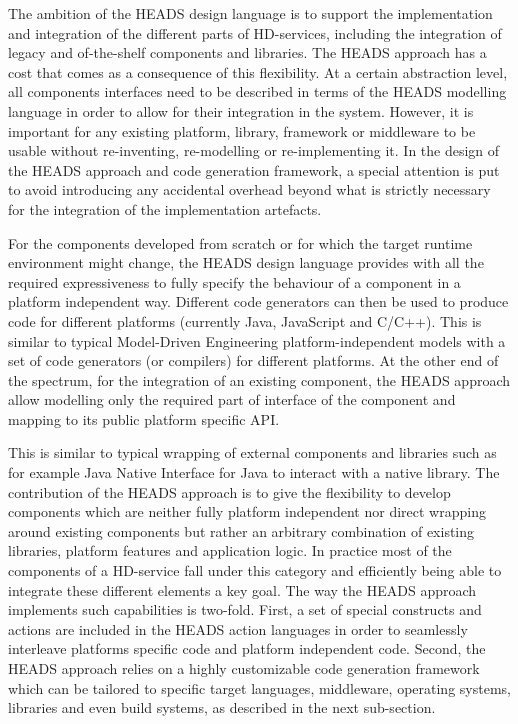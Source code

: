 The ambition of the HEADS design language is to support the implementation and integration of the different parts of HD-services, including the integration of legacy and of-the-shelf components and libraries. The HEADS approach has a cost that comes as a consequence of this flexibility. At a certain abstraction level, all components interfaces need to be described in terms of the HEADS modelling language in order to allow for their integration in the system. However, it is important for any existing platform, library, framework or middleware to be usable without re-inventing, re-modelling or re-implementing it. In the design of the HEADS approach and code generation framework, a special attention is put to avoid introducing any accidental overhead beyond what is strictly necessary for the integration of the implementation artefacts. 

For the components developed from scratch or for which the target runtime environment might change, the HEADS design language provides with all the required expressiveness to fully specify the behaviour of a component in a platform independent way. Different code generators can then be used to produce code for different platforms (currently Java, JavaScript and C/C++). This is similar to typical Model-Driven Engineering platform-independent models with a set of code generators (or compilers) for different platforms. At the other end of the spectrum, for the integration of an existing component, the HEADS approach allow modelling only the required part of interface of the component and mapping to its public platform specific API. 

This is similar to typical wrapping of external components and libraries such as for example Java Native Interface for Java to interact with a native library. The contribution of the HEADS approach is to give the flexibility to develop components which are neither fully platform independent nor direct wrapping around existing components but rather an arbitrary combination of existing libraries, platform features and application logic. In practice most of the components of a HD-service fall under this category and efficiently being able to integrate these different elements a key goal. The way the HEADS approach implements such capabilities is two-fold. First, a set of special constructs and actions are included in the HEADS action languages in order to seamlessly interleave platforms specific code and platform independent code. Second, the HEADS approach relies on a highly customizable code generation framework which can be tailored to specific target languages, middleware, operating systems, libraries and even build systems, as described in the next sub-section.

